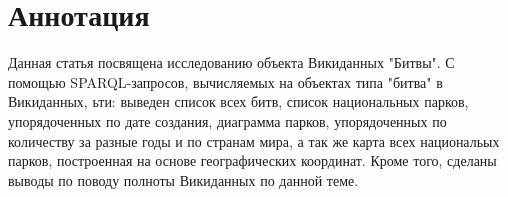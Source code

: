 \section{Аннотация}

Данная статья посвящена исследованию объекта Викиданных "Битвы". С помощью SPARQL-запросов, вычисляемых на объектах типа "битва" в Викиданных, ьти: выведен список всех битв, список национальных парков, упорядоченных по дате создания, диаграмма парков, упорядоченных по количеству за разные годы и по странам мира, а так же карта всех национальых парков, построенная на основе географических координат. Кроме того, сделаны выводы по поводу полноты Викиданных по данной теме.